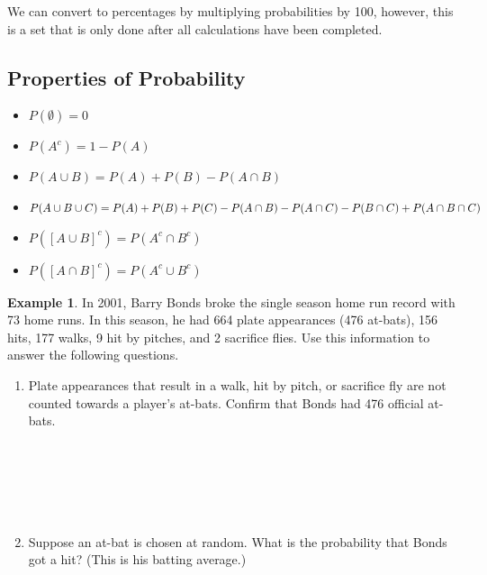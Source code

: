 \documentclass[
  11pt,
]{book}
\theoremstyle{definition}
\theoremstyle{definition}
\newtheorem{example}{Example}[chapter]
\theoremstyle{definition}
\theoremstyle{definition}
\theoremstyle{remark}
\begin{document}
We can convert to percentages by multiplying probabilities by 100, however, this is a set that is only done after all calculations have been completed.

\hypertarget{properties-of-probability}{%
\subsection{Properties of Probability}\label{properties-of-probability}}

\begin{itemize}
\item
  \(P(\emptyset) = 0\)\\
\item
  \(P(A^c) = 1 - P(A)\)\\
\item
  \(P(A \cup B) = P(A) + P(B) - P(A \cap B)\)\\
\item
  \(P(A \cup B \cup C) = \\ P(A) + P(B) + P(C) - P(A \cap B) - P(A \cap C) - P(B \cap C) + P(A \cap B \cap C)\)\\
\item
  \(P([A \cup B]^c) = P(A^c \cap B^c)\)\\
\item
  \(P([A \cap B]^c) = P(A^c \cup B^c)\)\\
\end{itemize}

\newpage

\begin{example}
In 2001, Barry Bonds broke the single season home run record with 73 home runs. In this season, he had 664 plate appearances (476 at-bats), 156 hits, 177 walks, 9 hit by pitches, and 2 sacrifice flies. Use this information to answer the following questions.
\end{example}

\begin{enumerate}
\def\labelenumi{(\alph{enumi})}
\item
  Plate appearances that result in a walk, hit by pitch, or sacrifice fly are not counted towards a player's at-bats. Confirm that Bonds had 476 official at-bats.\\
  \strut \\
  \strut \\
  \strut \\
  \vfill
\item
  Suppose an at-bat is chosen at random. What is the probability that Bonds got a hit? (This is his batting average.)\\
  \strut \\
  \strut \\
  \strut \\
  \vfill
\end{enumerate}
\end{document}
